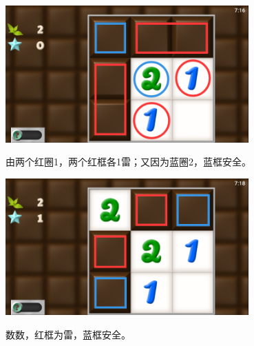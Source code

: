 \subsection{} %
\begin{center}
    \includegraphics[width=0.7\textwidth]{puzzle/3-1.png}
\end{center}
由两个红圈1，两个红框各1雷；又因为蓝圈2，蓝框安全。
\begin{center}
    \includegraphics[width=0.7\textwidth]{puzzle/3-2.png}
\end{center}
数数，红框为雷，蓝框安全。

